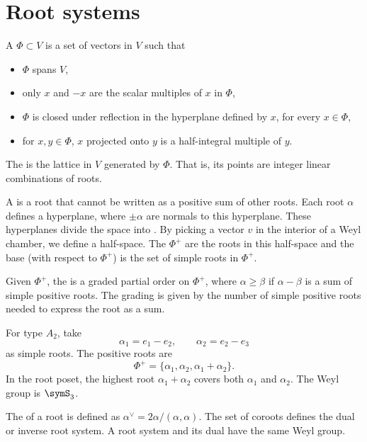 
\section[rootSystem]{Root systems}

A  $\Phi \subset V$ is a set of vectors in $V$ such that
\begin{itemize}
 \item $\Phi$ spans $V$,
 \item only $x$ and $-x$ are the scalar multiples of $x$ in $\Phi$,
 \item $\Phi$ is closed under reflection in the hyperplane defined by $x$, for every $x \in \Phi$,
 \item for $x, y \in \Phi$, $x$ projected onto $y$ is a half-integral multiple of $y$.
\end{itemize}

The  is the lattice in $V$ generated by $\Phi$.
That is, its points are integer linear combinations of roots.

A  is a root that cannot be written as a positive sum of other roots.
Each root $\alpha$ defines a hyperplane, where $\pm \alpha$ are normals to this hyperplane.
These hyperplanes divide the space into .
By picking a vector $v$ in the interior of a Weyl chamber, we define a half-space.
The  $\Phi^+$ are the roots in this half-space
and the base (with respect to $\Phi^+$) is the set of simple roots in $\Phi^+$.

Given $\Phi^+$, the  is a graded partial order on $\Phi^+$, where $\alpha \geq \beta$ if $\alpha - \beta$
is a sum of simple positive roots.
The grading is given by the number of simple positive roots needed to express the root as a sum.

\begin{example*}[Type $A_2$]
For type $A_2$, take
\[
  \alpha_1=e_1-e_2,\qquad \alpha_2=e_2-e_3
\]
as simple roots.  The positive roots are
\[
  \Phi^+=\{\alpha_1,\alpha_2,\alpha_1+\alpha_2\}.
\]
In the root poset, the highest root $\alpha_1+\alpha_2$ covers both
$\alpha_1$ and $\alpha_2$.  The Weyl group is $\symS_3$.
\end{example*}

The  of a root is defined as $\alpha^\vee = 2\alpha/(\alpha,\alpha)$.
The set of coroots defines the dual or inverse root system.
A root system and its dual have the same Weyl group.


